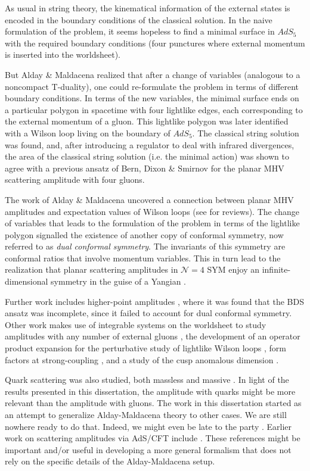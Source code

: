 As usual in string theory, the kinematical information of the external states is encoded in the boundary conditions of the classical solution. In the naive formulation of the problem, it seems hopeless to find a minimal surface in $AdS_{5}$ with the required boundary conditions (four punctures where external momentum is inserted into the worldsheet).

But Alday \& Maldacena realized that after a change of variables (analogous to a noncompact T-duality), one could re-formulate the problem in terms of different boundary conditions. In terms of the new variables, the minimal surface ends on a particular polygon in spacetime with four lightlike edges, each corresponding to the external momentum of a gluon. This lightlike polygon was later identified with a Wilson loop living on the boundary of $AdS_{5}$. The classical string solution was found, and, after introducing a regulator to deal with infrared divergences, the area of the classical string solution (i.e. the minimal action) was shown to agree with a previous ansatz of Bern, Dixon \& Smirnov \cite{Bern:2005iz} for the planar MHV scattering amplitude with four gluons.

The work of Alday \& Maldacena uncovered a connection between planar MHV amplitudes and expectation values of Wilson loops (see \cite{Alday:2008yw,Alday:2010kn} for reviews). The change of variables that leads to the formulation of the problem in terms of the lightlike polygon signalled the existence of another copy of conformal symmetry, now referred to as \textit{dual conformal symmetry}. The invariants of this symmetry are conformal ratios that involve momentum variables. This in turn lead to the realization that planar scattering amplitudes in $\mathcal{N} = 4$ SYM enjoy an infinite-dimensional symmetry in the guise of a Yangian \cite{Berkovits:2008ic,Drummond:2009fd}.

Further work includes higher-point amplitudes \cite{Alday:2007mf,Alday:2007he}, where it was found that the BDS ansatz was incomplete, since it failed to account for dual conformal symmetry. Other work makes use of integrable systems on the worldsheet to study amplitudes with any number of external gluons \cite{Alday:2009yn,Alday:2009dv,Alday:2010vh}, the development of an operator product expansion for the perturbative study of lightlike Wilson loops \cite{Alday:2010ku,Gaiotto:2010fk,Gaiotto:2011dt}, form factors at strong-coupling \cite{Maldacena:2010kp}, and a study of the cusp anomalous dimension \cite{Correa:2012at,Correa:2012nk,Correa:2012hh}.

Quark scattering was also studied, both massless \cite{Komargodski:2007er,McGreevy:2007kt} and massive \cite{Barnes:2009ag}. In light of the results presented in this dissertation, the amplitude with quarks might be more relevant than the amplitude with gluons. The work in this dissertation started as an attempt to generalize Alday-Maldacena theory to other cases. We are still nowhere ready to do that. Indeed, we might even be late to the party \cite{Giordano:2011ua}. Earlier work on scattering amplitudes via AdS/CFT include \cite{Rho:1999jm,Janik:1999zk,Janik:2000aj}. These references might be important and/or useful in developing a more general formalism that does not rely on the specific details of the Alday-Maldacena setup.